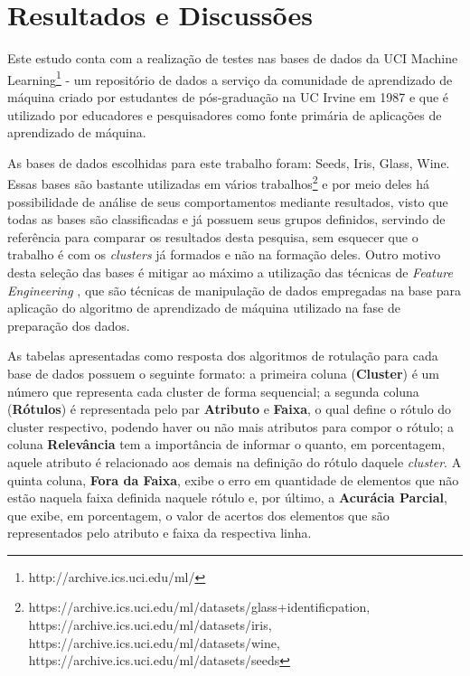  \chapter{Resultados e Discussões}\label{cap:resultados}


Este estudo conta com a realização de testes nas bases de dados da UCI Machine Learning\footnote{http://archive.ics.uci.edu/ml/} - um repositório de dados a serviço da comunidade de aprendizado de máquina criado por estudantes de pós-graduação na UC Irvine em 1987 e que é utilizado por educadores e pesquisadores como fonte primária de aplicações de aprendizado de máquina. 



 
As bases de dados escolhidas para este trabalho foram: Seeds, Iris, Glass, Wine. Essas bases são bastante utilizadas em vários trabalhos\footnote{https://archive.ics.uci.edu/ml/datasets/glass+identificpation, https://archive.ics.uci.edu/ml/datasets/iris, https://archive.ics.uci.edu/ml/datasets/wine, https://archive.ics.uci.edu/ml/datasets/seeds}  e por meio deles há possibilidade de análise de seus comportamentos mediante resultados, visto que todas as bases são classificadas e já possuem seus grupos definidos, servindo de referência para comparar os resultados desta pesquisa, sem esquecer que o trabalho é com os \textit{clusters} já formados e não na formação deles. Outro motivo desta seleção das bases é mitigar ao máximo a utilização das técnicas de \textit{Feature Engineering} \cite{Casari2018}, que são técnicas de manipulação de dados empregadas na base para aplicação do algoritmo de aprendizado de máquina utilizado na fase de preparação dos dados.


As tabelas apresentadas como resposta dos algoritmos de rotulação para cada base de dados possuem o seguinte formato: a primeira coluna (\textbf{Cluster}) é um número que representa cada cluster de forma sequencial; a segunda coluna (\textbf{Rótulos}) é representada pelo par \textbf{Atributo} e \textbf{Faixa}, o qual define o rótulo do cluster respectivo, podendo haver ou não mais atributos para compor o rótulo; a coluna \textbf{Relevância} tem a importância de informar o quanto, em porcentagem, aquele atributo é relacionado aos demais na definição do rótulo daquele \textit{cluster}. A quinta coluna, \textbf{Fora da Faixa}, exibe o erro em quantidade de elementos que não estão naquela faixa definida naquele rótulo e, por último, a \textbf{Acurácia Parcial}, que exibe, em porcentagem, o valor de acertos dos elementos que são representados pelo atributo e faixa da respectiva linha. 

